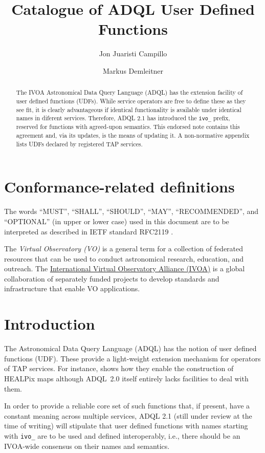 \documentclass[11pt,a4paper]{ivoa}
\title{Catalogue of ADQL User Defined Functions}
\author[https://wiki.ivoa.net/twiki/bin/view/IVOA/JonJuaristiCampillo]{Jon Juaristi Campillo}
\author[https://wiki.ivoa.net/twiki/bin/view/IVOA/MarkusDemleitner]{Markus Demleitner}
\begin{document}
\begin{abstract}
The IVOA Astronomical Data Query Language (ADQL) has the extension
facility of user defined functions (UDFs).  While service operators are
free to define these as they see fit, it is clearly advantageous if
identical functionality is available under identical names in diferent
services.  Therefore, ADQL 2.1 has introduced the \verb|ivo_| prefix,
reserved for functions with agreed-upon semantics.  This endorsed note
contains this agreement and, via its updates, is the means of updating
it.  A non-normative appendix lists UDFs declared by registered TAP
services.
\end{abstract}


\section*{Conformance-related definitions}

The words ``MUST'', ``SHALL'', ``SHOULD'', ``MAY'', ``RECOMMENDED'', and
``OPTIONAL'' (in upper or lower case) used in this document are to be
interpreted as described in IETF standard RFC2119 \citep{std:RFC2119}.

The \emph{Virtual Observatory (VO)} is a
general term for a collection of federated resources that can be used
to conduct astronomical research, education, and outreach.
The \href{http://www.ivoa.net}{International
Virtual Observatory Alliance (IVOA)} is a global
collaboration of separately funded projects to develop standards and
infrastructure that enable VO applications.


\section{Introduction}

The Astronomical Data Query Language (ADQL) \citep{2008ivoa.spec.1030O}
has the notion of user defined functions (UDF).  These provide a
light-weight extension mechanism for operators of TAP services.  
For instance, \citet{2016arXiv161109190T} shows how they enable the
construction of HEALPix maps although ADQL~2.0 itself entirely lacks
facilities to deal with them.

In order to provide a reliable core set of such functions that, if
present, have a constant meaning across multiple services, ADQL 2.1
(still under review at the time of writing) will stipulate that user
defined functions with names starting with \verb|ivo_| are to be used
and defined interoperably, i.e., there should be an IVOA-wide consensus
on their names and semantics. 
\end{document}
